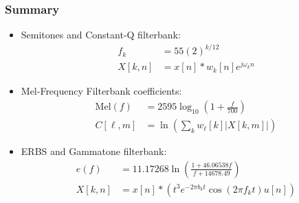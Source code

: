 \documentclass{beamer}
\begin{document}
\begin{frame}
  \frametitle{Summary}
  \begin{itemize}
  \item Semitones and Constant-Q filterbank:
    \begin{align*}
      f_k &= 55(2)^{k/12}\\
      X[k,n] &= x[n]\ast w_k[n]e^{j\omega_k n}
    \end{align*}
  \item Mel-Frequency Filterbank coefficients:
    \begin{align*}
      \mbox{Mel}(f) &= 2595\log_{10}\left(1+\frac{f}{700}\right)\\
      C[\ell,m] &= \ln\left(\sum_k w_\ell[k] |X[k,m]|\right)
    \end{align*}
  \item ERBS and Gammatone filterbank:
    \begin{align*}
      e(f)  &= 11.17268 \ln\left(\frac{1+46.06538f}{f+14678.49}\right)\\
      X[k,n] &= x[n]\ast \left(t^3 e^{-2\pi b_kt}\cos(2\pi f_k t)u[n]\right)
    \end{align*}
  \end{itemize}
\end{frame}
    
\end{document}
